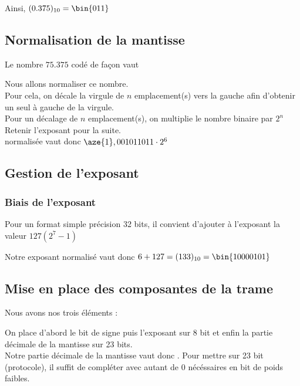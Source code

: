 Ainsi, $(0.375)_{10} = \bin{011}$

\subsection{Normalisation de la mantisse}

Le nombre $75.375$ codé de façon  vaut 

Nous allons normaliser ce nombre. \\

Pour cela, on décale la virgule de $n$ emplacement(s) vers la gauche afin d'obtenir un seul  à gauche de la virgule. \\

Pour un décalage de $n$ emplacement(s), on multiplie le nombre binaire par $2^n$ \\

Retenir l'exposant  pour la suite. \\

 normalisée vaut donc $\aze{1},001011011 \cdot 2^6 $ 

\subsection{Gestion de l'exposant}

\subsubsection{Biais de l'exposant}

Pour un format simple précision 32 bits, il convient d'ajouter à l'exposant la valeur $127 (2^7-1)$

Notre exposant normalisé vaut donc $6+127=(133)_{10} = \bin{10000101}$

\subsection{Mise en place des composantes de la trame}

Nous avons nos trois éléments : 

On place d'abord le bit de signe puis l'exposant sur 8 bit et enfin la partie décimale de la mantisse sur 23 bits. \\

Notre partie décimale de la mantisse vaut donc . Pour mettre sur 23 bit (protocole), il suffit de compléter avec autant de 0 nécéssaires en bit de poids faibles. \\


